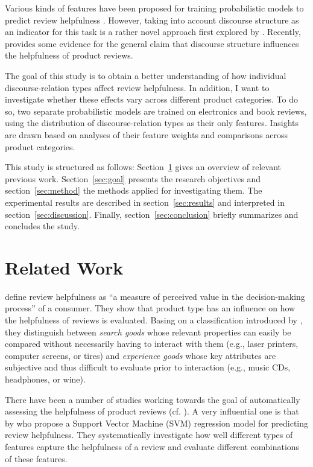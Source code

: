 \documentclass[
    a4paper,%
    12pt,%
    oneside,%
    toc=bibliography,
    final,
]{scrartcl}
\begin{document}
Various kinds of features have been proposed for training probabilistic models to predict review helpfulness \citep[cf.][50ff.]{Almagrabi2015}. However, taking into account discourse structure as an indicator for this task is a rather novel approach first explored by \citet{Mertz2014}. Recently, \citet{Golly2017} provides some evidence for the general claim that discourse structure influences the helpfulness of product reviews.

The goal of this study is to obtain a better understanding of how individual discourse-relation types affect review helpfulness. In addition, I want to investigate whether these effects vary across different product categories. To do so, two separate probabilistic models are trained on electronics and book reviews, using the distribution of discourse-relation types as their only features. Insights are drawn based on analyses of their feature weights and comparisons across product categories.

This study is structured as follows: Section~\ref{sec:related-work} gives an overview of relevant previous work. Section~\ref{sec:goal} presents the research objectives and section~\ref{sec:method} the methods applied for investigating them. The experimental results are described in section~\ref{sec:results} and interpreted in section~\ref{sec:discussion}. Finally, section~\ref{sec:conclusion} briefly summarizes and concludes the study.


\section{Related Work}
\label{sec:related-work}

\citet[186]{MudambiSchuff2010} define review helpfulness as “a measure of perceived value in the decision-making process” of a consumer. They show that product type has an influence on how the helpfulness of reviews is evaluated. Basing on a classification introduced by \citet{Nelson1970}, they distinguish between \textit{search goods} whose relevant properties can easily be compared without necessarily having to interact with them (e.g., laser printers, computer screens, or tires) and \textit{experience goods} whose key attributes are subjective and thus difficult to evaluate prior to interaction (e.g., music CDs, headphones, or wine).

There have been a number of studies working towards the goal of automatically assessing the helpfulness of product reviews (cf. \citealt{Almagrabi2015}). A very influential one is that by \citet{Kim2006} who propose a Support Vector Machine (SVM) regression model for predicting review helpfulness. They systematically investigate how well different types of features capture the helpfulness of a review and evaluate different combinations of these features.
\end{document}
